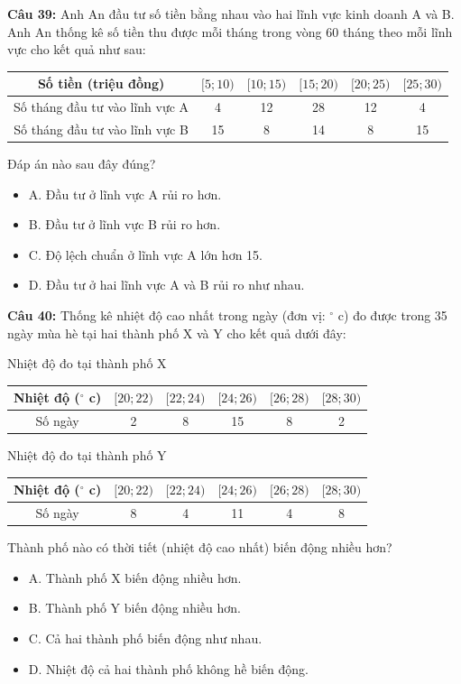 \documentclass[12pt]{article}
\begin{document}
	\noindent \textbf{Câu 39:} Anh An đầu tư số tiền bằng nhau vào hai lĩnh vực kinh doanh A và B. Anh An thống kê số tiền thu được mỗi tháng trong vòng 60 tháng theo mỗi lĩnh vực cho kết quả như sau:
	\begin{center}
		\renewcommand{\arraystretch}{1.3}
		\begin{tabular}{|c|c|c|c|c|c|}
			\hline
			Số tiền (triệu đồng) & $[5; 10)$ & $[10; 15)$ & $[15; 20)$ & $[20; 25)$ & $[25; 30)$ \\
			\hline
			Số tháng đầu tư vào lĩnh vực A & 4 & 12 & 28 & 12 & 4 \\
			\hline
			Số tháng đầu tư vào lĩnh vực B & 15 & 8 & 14 & 8 & 15 \\
			\hline
		\end{tabular}
	\end{center}
	Đáp án nào sau đây đúng?
	\begin{itemize}[label=, leftmargin=*]
		\item A. Đầu tư ở lĩnh vực A rủi ro hơn.
		\item B. Đầu tư ở lĩnh vực B rủi ro hơn.
		\item C. Độ lệch chuẩn ở lĩnh vực A lớn hơn 15.
		\item D. Đầu tư ở hai lĩnh vực A và B rủi ro như nhau.
	\end{itemize}
	
	\vspace{4mm}
	
	\noindent \textbf{Câu 40:} Thống kê nhiệt độ cao nhất trong ngày (đơn vị: $^\circ$ c) đo được trong 35 ngày mùa hè tại hai thành phố X và Y cho kết quả dưới đây:
	\begin{center}
		Nhiệt độ đo tại thành phố X
		\renewcommand{\arraystretch}{1.3}
		\begin{tabular}{|c|c|c|c|c|c|}
			\hline
			Nhiệt độ ($^\circ$ c) & $[20; 22)$ & $[22; 24)$ & $[24; 26)$ & $[26; 28)$ & $[28; 30)$ \\
			\hline
			Số ngày & 2 & 8 & 15 & 8 & 2 \\
			\hline
		\end{tabular}
	\end{center}
	\begin{center}
		Nhiệt độ đo tại thành phố Y
		\renewcommand{\arraystretch}{1.3}
		\begin{tabular}{|c|c|c|c|c|c|}
			\hline
			Nhiệt độ ($^\circ$ c) & $[20; 22)$ & $[22; 24)$ & $[24; 26)$ & $[26; 28)$ & $[28; 30)$ \\
			\hline
			Số ngày & 8 & 4 & 11 & 4 & 8 \\
			\hline
		\end{tabular}
	\end{center}
	Thành phố nào có thời tiết (nhiệt độ cao nhất) biến động nhiều hơn?
	\begin{itemize}[label=, leftmargin=*]
		\item A. Thành phố X biến động nhiều hơn.
		\item B. Thành phố Y biến động nhiều hơn.
		\item C. Cả hai thành phố biến động như nhau.
		\item D. Nhiệt độ cả hai thành phố không hề biến động.
	\end{itemize}
	
\end{document}

